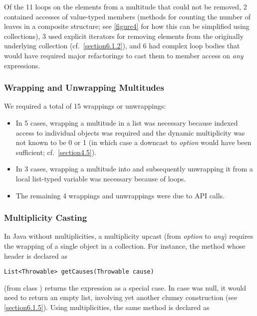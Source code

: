 {Of the 11 loops on the elements from a multitude that could not be
removed, 2 contained accesses of value-typed members (methods for counting
the number of leaves in a composite structure; see \autoref{figure4} for how this can
be simplified using collections), 3 used explicit iterators for removing
elements from the originally underlying collection (cf.~\autoref{section6.1.2}), and
6 had complex loop bodies that would have required major refactorings to
cast them to member access on \emph{any} expressions.

\subsubsection{Wrapping and Unwrapping Multitudes}
\label{section6.1.2}

\noindent We required a total of 15 wrappings or unwrappings:

\begin{itemize}
  \item In 5 cases, wrapping a multitude in a list was necessary because
    indexed access to individual objects was required and the dynamic
    multiplicity was not known to be 0 or 1 (in which case a downcast to \emph{option}
    would have been sufficient; cf.~\autoref{section4.5}).
  \item In 3 cases, wrapping a multitude into and subsequently unwrapping it
    from a local list-typed variable was necessary because of 
    loops.
  \item The remaining 4 wrappings and unwrappings were due to API calls.
\end{itemize}


\subsubsection{Multiplicity Casting}
\label{section6.1.3}

\noindent In Java without multiplicities, a multiplicity upcast (from
\emph{option} to \emph{any}) requires the wrapping of a single
object in a collection. For instance, the method whose header is declared as

\begin{lstlisting}
List<Throwable> getCauses(Throwable cause)
\end{lstlisting}

\noindent (from class ) returns the expression
 as a special case. In case  was
null, it would need to return an empty list, involving yet another clumsy
construction (see \autoref{section6.1.5}). Using multiplicities, the same method is
declared as

}
